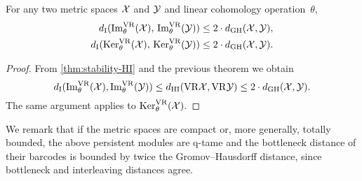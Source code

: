 \medskip\corollary For any two metric spaces $\mathcal{X}$ and $\mathcal{Y}$ and linear cohomology operation~$\theta$,
\begin{align*}
	d_{\mathrm{I}}(\operatorname{Im}_\theta^{\mathrm{VR}}(\mathcal{X}),\, \operatorname{Im}_\theta^{\mathrm{VR}}(\mathcal{Y})) \leq 2 \cdot d_{\mathrm{GH}}(\mathcal{X},\mathcal{Y}), \\
	d_{\mathrm{I}}(\operatorname{Ker}_\theta^{\mathrm{VR}}(\mathcal{X}),\, \operatorname{Ker}_\theta^{\mathrm{VR}}(\mathcal{Y})) \leq 2 \cdot d_{\mathrm{GH}}(\mathcal{X},\mathcal{Y}).
\end{align*}

\begin{proof}
	From \cref{thm:stability-HI} and the previous theorem we obtain
	\[
	d_{\mathrm{I}}(\operatorname{Im}_\theta^{\mathrm{VR}}(\mathcal{X}), \operatorname{Im}_\theta^{\mathrm{VR}}(\mathcal{Y})) \leq
	d_{\mathrm{HI}}(\mathrm{VR}\mathcal{X}, \mathrm{VR}\mathcal{Y}) \leq 2 \cdot d_{\mathrm{GH}}(\mathcal{X},\mathcal{Y}).
	\]
	The same argument applies to $\operatorname{Ker}_\theta^{\mathrm{VR}}(\mathcal{X})$.
\end{proof}

We remark that if the metric spaces are compact or, more generally, totally bounded, the above persistent modules are q-tame and the bottleneck distance of their barcodes is bounded by twice the Gromov--Hausdorff distance, since bottleneck and interleaving distances agree.